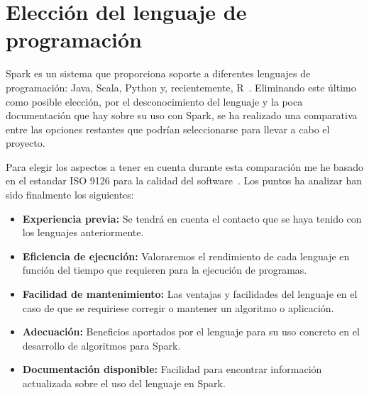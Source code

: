 


\section{Elección del lenguaje de programación}\label{EleccionLenguaje}

Spark es un sistema que proporciona soporte a diferentes lenguajes de programación: Java, Scala, Python y, recientemente, R~\cite{SparkDoc}. Eliminando este último como posible elección, por el desconocimiento del lenguaje y la poca documentación que hay sobre su uso con Spark, se ha realizado una comparativa entre las opciones restantes que podrían seleccionarse para llevar a cabo el proyecto.

Para elegir los aspectos a tener en cuenta durante esta comparación me he basado en el estandar ISO 9126 para la calidad del software~\cite{ISO9126}. Los puntos ha analizar han sido finalmente los siguientes: \\

\begin{itemize}
	\item \textbf{Experiencia previa:} Se tendrá en cuenta el contacto que se haya tenido con los lenguajes anteriormente.
	\item \textbf{Eficiencia de ejecución:} Valoraremos el rendimiento de cada lenguaje en función del tiempo que requieren para la ejecución de programas. 
	\item \textbf{Facilidad de mantenimiento:}  Las ventajas y facilidades del lenguaje en el caso de que se requiriese corregir o mantener un algoritmo o aplicación. 
	\item \textbf{Adecuación:} Beneficios aportados por el lenguaje para su uso concreto en el desarrollo de algoritmos para Spark.
	\item \textbf{Documentación disponible:} Facilidad para encontrar información actualizada sobre el uso del lenguaje en Spark.
	
\end{itemize}

